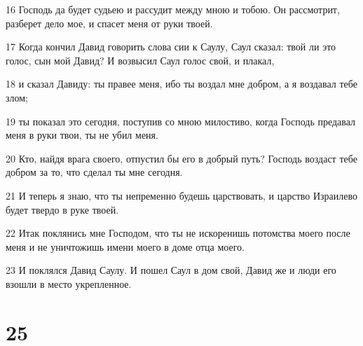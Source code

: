 \par 16 Господь да будет судьею и рассудит между мною и тобою. Он рассмотрит, разберет дело мое, и спасет меня от руки твоей.
\par 17 Когда кончил Давид говорить слова сии к Саулу, Саул сказал: твой ли это голос, сын мой Давид? И возвысил Саул голос свой, и плакал,
\par 18 и сказал Давиду: ты правее меня, ибо ты воздал мне добром, а я воздавал тебе злом;
\par 19 ты показал это сегодня, поступив со мною милостиво, когда Господь предавал меня в руки твои, ты не убил меня.
\par 20 Кто, найдя врага своего, отпустил бы его в добрый путь? Господь воздаст тебе добром за то, что сделал ты мне сегодня.
\par 21 И теперь я знаю, что ты непременно будешь царствовать, и царство Израилево будет твердо в руке твоей.
\par 22 Итак поклянись мне Господом, что ты не искоренишь потомства моего после меня и не уничтожишь имени моего в доме отца моего.
\par 23 И поклялся Давид Саулу. И пошел Саул в дом свой, Давид же и люди его взошли в место укрепленное.

\chapter{25}

